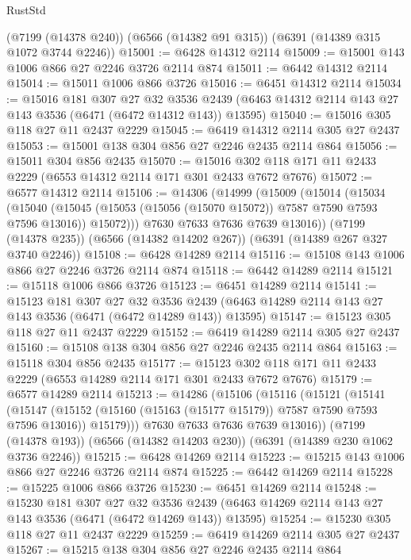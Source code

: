 \begin{lexlean}{RustStd}
\begin{coremodule}
    (@7199 (@14378 @240))
    (@6566 (@14382 @91 @315))
    (@6391 (@14389 @315 @1072 @3744 @2246))
@15001 := @6428 @14312 @2114
@15009 := @15001 @143 @1006 @866 @27 @2246 @3726 @2114 @874
@15011 := @6442 @14312 @2114
@15014 := @15011 @1006 @866 @3726
@15016 := @6451 @14312 @2114
@15034 := @15016
    @181
    @307
    @27
    @32
    @3536
    @2439
    (@6463 @14312 @2114 @143 @27 @143 @3536 (@6471 (@6472 @14312 @143)) @13595)
@15040 := @15016 @305 @118 @27 @11 @2437 @2229
@15045 := @6419 @14312 @2114 @305 @27 @2437
@15053 := @15001 @138 @304 @856 @27 @2246 @2435 @2114 @864
@15056 := @15011 @304 @856 @2435
@15070 := @15016 @302 @118 @171 @11 @2433 @2229 (@6553 @14312 @2114 @171 @301 @2433 @7672 @7676)
@15072 := @6577 @14312 @2114
@15106 := @14306
    (@14999
      (@15009
        (@15014
          (@15034
            (@15040
              (@15045 (@15053 (@15056 (@15070 @15072)) @7587 @7590 @7593 @7596 @13016))
              @15072)))
        @7630
        @7633
        @7636
        @7639
        @13016))
    (@7199 (@14378 @235))
    (@6566 (@14382 @14202 @267))
    (@6391 (@14389 @267 @327 @3740 @2246))
@15108 := @6428 @14289 @2114
@15116 := @15108 @143 @1006 @866 @27 @2246 @3726 @2114 @874
@15118 := @6442 @14289 @2114
@15121 := @15118 @1006 @866 @3726
@15123 := @6451 @14289 @2114
@15141 := @15123
    @181
    @307
    @27
    @32
    @3536
    @2439
    (@6463 @14289 @2114 @143 @27 @143 @3536 (@6471 (@6472 @14289 @143)) @13595)
@15147 := @15123 @305 @118 @27 @11 @2437 @2229
@15152 := @6419 @14289 @2114 @305 @27 @2437
@15160 := @15108 @138 @304 @856 @27 @2246 @2435 @2114 @864
@15163 := @15118 @304 @856 @2435
@15177 := @15123 @302 @118 @171 @11 @2433 @2229 (@6553 @14289 @2114 @171 @301 @2433 @7672 @7676)
@15179 := @6577 @14289 @2114
@15213 := @14286
    (@15106
      (@15116
        (@15121
          (@15141
            (@15147
              (@15152 (@15160 (@15163 (@15177 @15179)) @7587 @7590 @7593 @7596 @13016))
              @15179)))
        @7630
        @7633
        @7636
        @7639
        @13016))
    (@7199 (@14378 @193))
    (@6566 (@14382 @14203 @230))
    (@6391 (@14389 @230 @1062 @3736 @2246))
@15215 := @6428 @14269 @2114
@15223 := @15215 @143 @1006 @866 @27 @2246 @3726 @2114 @874
@15225 := @6442 @14269 @2114
@15228 := @15225 @1006 @866 @3726
@15230 := @6451 @14269 @2114
@15248 := @15230
    @181
    @307
    @27
    @32
    @3536
    @2439
    (@6463 @14269 @2114 @143 @27 @143 @3536 (@6471 (@6472 @14269 @143)) @13595)
@15254 := @15230 @305 @118 @27 @11 @2437 @2229
@15259 := @6419 @14269 @2114 @305 @27 @2437
@15267 := @15215 @138 @304 @856 @27 @2246 @2435 @2114 @864

\end{coremodule}
\end{lexlean}
